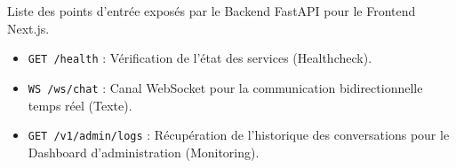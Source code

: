 Liste des points d'entrée exposés par le Backend FastAPI pour le Frontend Next.js.

\begin{itemize}
    \item \texttt{GET /health} : Vérification de l'état des services (Healthcheck).
    \item \texttt{WS /ws/chat} : Canal WebSocket pour la communication bidirectionnelle temps réel (Texte).
    \item \texttt{GET /v1/admin/logs} : Récupération de l'historique des conversations pour le Dashboard d'administration (Monitoring).
\end{itemize}